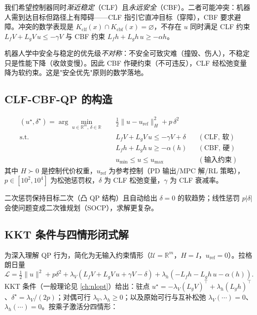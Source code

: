 我们希望控制器同时\emph{渐近稳定}（CLF）且\emph{永远安全}（CBF）。二者可能冲突：机器人需到达目标但路径上有障碍——CLF 指引它直冲目标（穿障），CBF 要求避障。冲突的数学表现是 $K_{\mathrm{clf}}(x)\cap K_{\mathrm{cbf}}(x)=\varnothing$，不存在 $u$ 同时满足 CLF 约束 $L_fV+L_gV\,u\le-\gamma V$ 与 CBF 约束 $L_fh+L_gh\,u\ge-\alpha h$。

\begin{insight}[安全优先的数学实现]
机器人学中安全与稳定的优先级\emph{不对称}：不安全可致灾难（撞毁、伤人），不稳定只是性能下降（收敛变慢）。因此 CBF 作硬约束（不可违反），CLF 经松弛变量降为软约束。这是"安全优先"原则的数学落地。
\end{insight}

\subsection{CLF-CBF-QP 的构造}

\begin{equation}
\begin{aligned}
(u^\star,\delta^\star)=\arg\min_{u\in\mathbb R^m,\,\delta\in\mathbb R}\quad&\tfrac12\|u-u_{\mathrm{ref}}\|_H^2+p\,\delta^2\\
\text{s.t.}\quad&L_fV+L_gV\,u\le-\gamma V+\delta &&(\text{CLF, 软})\\
&L_fh+L_gh\,u\ge-\alpha(h) &&(\text{CBF, 硬})\\
&u_{\min}\le u\le u_{\max} &&(\text{输入约束})
\end{aligned}
\label{eq:clf-cbf-qp}
\end{equation}
其中 $H\succ0$ 是控制代价权重，$u_{\mathrm{ref}}$ 为参考控制（PD 输出/MPC 解/RL 策略），$p\in[10^2,10^4]$ 为松弛惩罚权，$\delta$ 为 CLF 松弛变量，$\gamma$ 为 CLF 衰减率。

\begin{remark}
二次惩罚保持目标二次（凸 QP 结构）且自动给出 $\delta=0$ 的软趋势；线性惩罚 $p|\delta|$ 会使问题变成二次锥规划（SOCP），求解更复杂。
\end{remark}

\subsection{KKT 条件与四情形闭式解}

为深入理解 QP 行为，简化为无输入约束情形（$\mathcal U=\mathbb R^m$，$H=I$，$u_{\mathrm{ref}}=0$）。拉格朗日量
\[
\mathcal L=\tfrac12\|u\|^2+p\delta^2+\lambda_V(L_fV+L_gV\,u+\gamma V-\delta)+\lambda_h(-L_fh-L_gh\,u-\alpha(h)).
\]
KKT 条件（一般理论见 \cref{ch:nlopt}）给出：驻点 $u^\star=-\lambda_V(L_gV)^\top+\lambda_h(L_gh)^\top$、$\delta^\star=\lambda_V/(2p)$；对偶可行 $\lambda_V,\lambda_h\ge0$；以及原始可行与互补松弛 $\lambda_V(\cdots)=0$、$\lambda_h(\cdots)=0$。按乘子激活分四情形：

